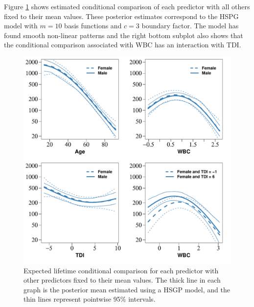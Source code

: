 \documentclass[]{interact}
\theoremstyle{plain}%
\theoremstyle{definition}
\theoremstyle{remark}
\begin{document}

Figure \ref{fig21_posteriors_leukemia} shows estimated conditional comparison of each predictor with all others fixed to their mean values. These posterior estimates correspond to the HSPG model with $m=10$ basis functions and $c=3$ boundary factor. The model has found smooth non-linear patterns and the right bottom subplot also shows that the conditional comparison associated with WBC has an interaction with TDI.

\begin{figure}
\centering
\includegraphics[scale=0.70, trim = 0mm 0mm 0mm 0mm, clip]{fig21_posteriors_leukemia_01.pdf}
\caption{Expected lifetime conditional comparison for each predictor with other predictors fixed to their mean values. The thick line in each graph is the posterior mean estimated using a HSGP model, and the thin lines represent pointwise 95\% intervals.}
  \label{fig21_posteriors_leukemia}
\end{figure}
\end{document}
